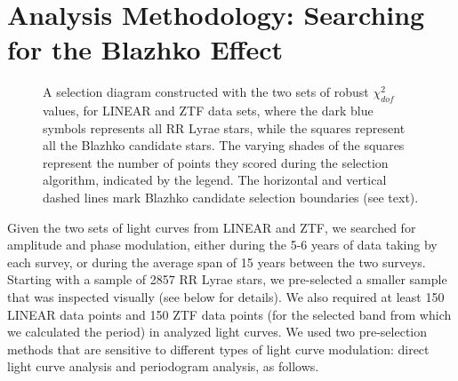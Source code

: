 \section{Analysis Methodology: Searching for the Blazhko Effect  \label{sec:analysis}}  

\begin{figure}[ht]
\caption{A selection diagram constructed with the two sets of robust $\chi^2_{dof}$ values, for LINEAR and ZTF data sets, where
 the dark blue symbols represents all RR Lyrae stars, while the squares represent all the Blazhko candidate stars. The varying shades of the squares represent the
 number of points they scored during the selection algorithm, indicated by the legend. The horizontal
  and vertical dashed lines mark Blazhko candidate selection boundaries (see text).}
\label{fig:chi2}
\end{figure}


Given the two sets of light curves from LINEAR and ZTF, we searched for amplitude and phase modulation,
either during the 5-6 years of data taking by each survey, or during the average span of 15 years between the two
surveys. Starting with a sample of 2857 RR Lyrae stars, we pre-selected a smaller sample that was inspected
visually (see below for details). We also required at least 150 LINEAR data points and 150 ZTF data points (for the selected band from which we calculated the period)
in analyzed light curves. We used two pre-selection methods that are sensitive to different types of light curve
modulation: direct light curve analysis and periodogram analysis, as follows.
 

